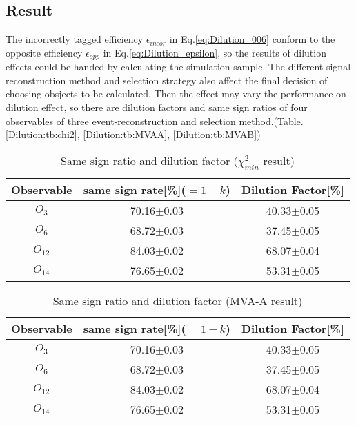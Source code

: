 	\subsection{Result}
	\label{Dilution:result}
		
		The incorrectly tagged efficiency $\epsilon_{incor}$ in Eq.\ref{eq:Dilution_006} conform to the opposite efficiency $\epsilon_{opp}$ in Eq.\ref{eq:Dilution_epsilon}, so the results of dilution effects could be handed by calculating the simulation sample. The different signal reconstruction method and selection strategy also affect the final decision of choosing obsjects to be calculated. Then the effect may vary the performance on dilution effect, so there are dilution factors and same sign ratios of four observables of three event-reconstruction and selection method.(Table. \ref{Dilution:tb:chi2}, \ref{Dilution:tb:MVAA}, \ref{Dilution:tb:MVAB})

		\begin{center}
		\setlength{\tabcolsep}{12pt}
		\begin{longtable}{ c | c c }
		\caption{Same sign ratio and dilution factor ($\chi^2_{min}$ result)}\\
		Observable & same sign rate[\%]($=1-k$) & Dilution Factor[\%] \\
		\hline
		$O_{3}$ & 70.16$\pm$0.03  &  40.33$\pm$0.05  \\
		$O_{6}$ &  68.72$\pm$0.03  &  37.45$\pm$0.05  \\
		$O_{12}$ &  84.03$\pm$0.02  &  68.07$\pm$0.04  \\
		$O_{14}$ &  76.65$\pm$0.02  &  53.31$\pm$0.05  \\
		\hline
		\end{longtable}
		\label{Dilution:tb:chi2}
		\end{center}

		\begin{center}
		\setlength{\tabcolsep}{12pt}
		\begin{longtable}{ c | c c }
		\caption{Same sign ratio and dilution factor (MVA-A result)}\\
		Observable & same sign rate[\%]($=1-k$) & Dilution Factor[\%] \\
		\hline
		$O_{3}$ & 70.16$\pm$0.03  &  40.33$\pm$0.05  \\
		$O_{6}$ &  68.72$\pm$0.03  &  37.45$\pm$0.05  \\
		$O_{12}$ &  84.03$\pm$0.02  &  68.07$\pm$0.04  \\
		$O_{14}$ &  76.65$\pm$0.02  &  53.31$\pm$0.05  \\
		\hline
		\end{longtable}
		\label{Dilution:tb:MVAA}
		\end{center}

